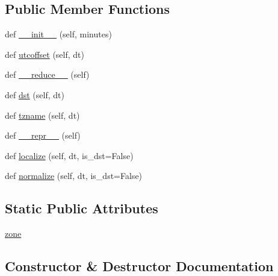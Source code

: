 \subsection*{Public Member Functions}
\begin{DoxyCompactItemize}
\item 
def \hyperlink{classpytz_1_1__FixedOffset_adc923c38519b3ffc71cb7e2ded08240e}{\+\_\+\+\_\+init\+\_\+\+\_\+} (self, minutes)
\item 
def \hyperlink{classpytz_1_1__FixedOffset_a9eb73f79e89d8186e9b215f9ec8a55b1}{utcoffset} (self, dt)
\item 
def \hyperlink{classpytz_1_1__FixedOffset_a309295504d2cde66802a7e99ebccb4a2}{\+\_\+\+\_\+reduce\+\_\+\+\_\+} (self)
\item 
def \hyperlink{classpytz_1_1__FixedOffset_a55da3b0fa7c79a983e3d18bc3ca84280}{dst} (self, dt)
\item 
def \hyperlink{classpytz_1_1__FixedOffset_a713c51656ca1c4baf17a1b82840a0393}{tzname} (self, dt)
\item 
def \hyperlink{classpytz_1_1__FixedOffset_ade422b67cb66720e844dc41483346509}{\+\_\+\+\_\+repr\+\_\+\+\_\+} (self)
\item 
def \hyperlink{classpytz_1_1__FixedOffset_a3f10b51d2aff2dcc4f2d01369af98fe0}{localize} (self, dt, is\+\_\+dst=False)
\item 
def \hyperlink{classpytz_1_1__FixedOffset_a253c43f37d8db4516b0ca967a31d8646}{normalize} (self, dt, is\+\_\+dst=False)
\end{DoxyCompactItemize}
\subsection*{Static Public Attributes}
\begin{DoxyCompactItemize}
\item 
\hyperlink{classpytz_1_1__FixedOffset_af8ac9e8a61a6ec6a4372d82eb802e141}{zone}
\end{DoxyCompactItemize}


\subsection{Constructor \& Destructor Documentation}
\mbox{\label{classpytz_1_1__FixedOffset_adc923c38519b3ffc71cb7e2ded08240e}} 
